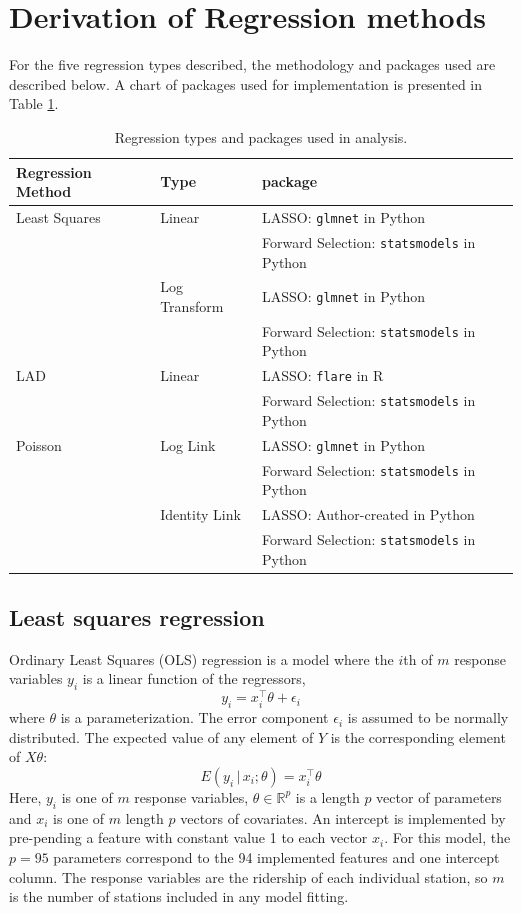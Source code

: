 \documentclass[11pt]{report}
\begin{document}
\section{Derivation of Regression methods}\label{sec:derive}
For the five regression types described, the methodology and packages used are described below. A chart of packages used for implementation is presented in Table \ref{tab:regtype}.

\begin{table} [H]
\centering
\begin{tabular}{lll}
\toprule Regression Method&Type&package\\
\midrule Least Squares&Linear&LASSO: \texttt{glmnet} in Python\\
&&Forward Selection: \texttt{statsmodels} in Python\\
&Log Transform&LASSO: \texttt{glmnet} in Python\\
&&Forward Selection: \texttt{statsmodels} in Python\\
LAD&Linear&LASSO: \texttt{flare} in R\\
&&Forward Selection: \texttt{statsmodels} in Python\\
Poisson&Log Link&LASSO: \texttt{glmnet} in Python\\
&&Forward Selection: \texttt{statsmodels} in Python\\
&Identity Link&LASSO: Author-created in Python\\
&&Forward Selection: \texttt{statsmodels} in Python\\
\bottomrule
\end{tabular}
\caption{Regression types and packages used in analysis.}
\label{tab:regtype}
\end{table}



\subsection{Least squares regression}\label{sec:lstsq}

Ordinary Least Squares (OLS) regression is a model where the $i$th of $m$ response variables $y_i$ is a linear function of the regressors,
\[y_i = x_i^\top\theta + \epsilon_i\] where $\theta$ is a parameterization. The error component $\epsilon_i$ is assumed to be normally distributed. The expected value of any element of $Y$ is the corresponding element of $X \theta$:
\[E(y_i\,|\,x_i; \theta) = x_i^\top\theta\]
Here, $y_i$ is one of $m$ response variables, $\theta\in\mathbb{R}^p$ is a length $p$ vector of parameters and $x_i$ is one of $m$ length $p$ vectors of covariates. An intercept is implemented by pre-pending a feature with constant value 1 to each vector $x_i$. For this model, the $p=95$ parameters correspond to the 94 implemented features and one intercept column. The response variables are the ridership of each individual station, so $m$ is the number of stations included in any model fitting.  
\end{document}
